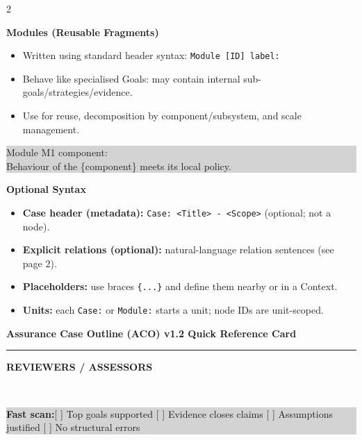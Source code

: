 \documentclass[10pt,letterpaper]{article}
\newcommand{\CardTitle}[1]{%
  \begin{center}
    {\Large\bfseries #1}\\[-2pt]
    \rule{0.92\linewidth}{0.6pt}
  \end{center}
}
\newcommand{\BannerBox}[1]{%
  \noindent\colorbox{Banner}{%
    \parbox{\linewidth}{\color{white}\bfseries\small\hspace{6pt}#1\hspace{6pt}}%
  }\\[10pt]
}
\newcommand{\Sec}[1]{%
  \vspace{5pt}%
  \noindent{\color{RuleGray}\rule{\linewidth}{0.35pt}}\par
  \vspace{2pt}%
  {\bfseries #1}\par
  \vspace{2pt}%
}
\newcommand{\Example}[1]{%
  \vspace{1pt}%
  \noindent\colorbox{LightGray}{%
    \parbox{\linewidth}{\ttfamily\footnotesize\raggedright
#1
    }%
  }%
  \vspace{2pt}%
}
\begin{document}
\begin{multicols*}{2}
\Sec{Modules (Reusable Fragments)}
\begin{itemize}
  \item Written using standard header syntax: \texttt{Module [ID] label:}
  \item Behave like specialised Goals: may contain internal sub-goals/strategies/evidence.
  \item Use for reuse, decomposition by component/subsystem, and scale management.
\end{itemize}
\Example{Module M1 component:\\
\hspace*{1.5em}Behaviour of the \string\{component\string\} meets its local policy.}

\Sec{Optional Syntax}
\begin{itemize}
  \item \textbf{Case header (metadata):} \texttt{Case: <Title> - <Scope>} (optional; not a node).
  \item \textbf{Explicit relations (optional):} natural-language relation sentences (see page 2).
  \item \textbf{Placeholders:} use braces \texttt{\string\{...\string\}} and define them nearby or in a Context.
  \item \textbf{Units:} each \texttt{Case:} or \texttt{Module:} starts a unit; node IDs are unit-scoped.
\end{itemize}

\end{multicols*}

\clearpage

\CardTitle{Assurance Case Outline (ACO) v1.2 Quick Reference Card}
\BannerBox{REVIEWERS / ASSESSORS}

\noindent\colorbox{LightGray}{%
\parbox{\linewidth}{\small
\textbf{Fast scan:}\hspace{0.6em}[ ] Top goals supported \hspace{0.6em}\hspace{0.6em}[ ] Evidence closes claims \hspace{0.6em}\hspace{0.6em}[ ] Assumptions justified \hspace{0.6em}\hspace{0.6em}[ ] No structural errors
}}\\[6pt]
\end{document}
